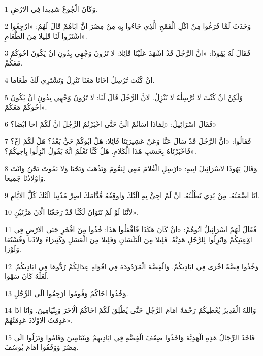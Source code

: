 \par 1 وَكَانَ الْجُوعُ شَدِيدا فِي الارْضِ.
\par 2 وَحَدَثَ لَمَّا فَرَغُوا مِنْ اكْلِ الْقَمْحِ الَّذِي جَاءُوا بِهِ مِنْ مِصْرَ انَّ ابَاهُمْ قَالَ لَهُمُ: «ارْجِعُوا اشْتَرُوا لَنَا قَلِيلا مِنَ الطَّعَامِ».
\par 3 فَقَالَ لَهُ يَهُوذَا: «انَّ الرَّجُلَ قَدْ اشْهَدَ عَلَيْنَا قَائِلا: لا تَرُونَ وَجْهِي بِدُونِ انْ يَكُونَ اخُوكُمْ مَعَكُمْ.
\par 4 انْ كُنْتَ تُرْسِلُ اخَانَا مَعَنَا نَنْزِلُ وَنَشْتَرِي لَكَ طَعَاما.
\par 5 وَلَكِنْ انْ كُنْتَ لا تُرْسِلُهُ لا نَنْزِلُ. لانَّ الرَّجُلَ قَالَ لَنَا: لا تَرُونَ وَجْهِي بِدُونِ انْ يَكُونَ اخُوكُمْ مَعَكُمْ».
\par 6 فَقَالَ اسْرَائِيلُ: «لِمَاذَا اسَاتُمْ الَيَّ حَتَّى اخْبَرْتُمُ الرَّجُلَ انَّ لَكُمْ اخا ايْضا؟»
\par 7 فَقَالُوا: «انَّ الرَّجُلَ قَدْ سَالَ عَنَّا وَعَنْ عَشِيرَتِنَا قَائِلا: هَلْ ابُوكُمْ حَيٌّ بَعْدُ؟ هَلْ لَكُمْ اخٌ؟ فَاخْبَرْنَاهُ بِحَسَبِ هَذَا الْكَلامِ. هَلْ كُنَّا نَعْلَمُ انَّهُ يَقُولُ انْزِلُوا بِاخِيكُمْ؟».
\par 8 وَقَالَ يَهُوذَا لاسْرَائِيلَ ابِيهِ: «ارْسِلِ الْغُلامَ مَعِي لِنَقُومَ وَنَذْهَبَ وَنَحْيَا وَلا نَمُوتَ نَحْنُ وَانْتَ وَاوْلادُنَا جَمِيعا.
\par 9 انَا اضْمَنُهُ. مِنْ يَدِي تَطْلُبُهُ. انْ لَمْ اجِئْ بِهِ الَيْكَ وَاوقِفْهُ قُدَّامَكَ اصِرْ مُذْنِبا الَيْكَ كُلَّ الايَّامِ.
\par 10 لانَّنَا لَوْ لَمْ نَتَوَانَ لَكُنَّا قَدْ رَجَعْنَا الْانَ مَرَّتَيْنِ».
\par 11 فَقَالَ لَهُمْ اسْرَائِيلُ ابُوهُمْ: «انْ كَانَ هَكَذَا فَافْعَلُوا هَذَا: خُذُوا مِنْ افْخَرِ جَنَى الارْضِ فِي اوْعِيَتِكُمْ وَانْزِلُوا لِلرَّجُلِ هَدِيَّةً. قَلِيلا مِنَ الْبَلَسَانِ وَقَلِيلا مِنَ الْعَسَلِ وَكَثِيرَاءَ وَلاذَنا وَفُسْتُقا وَلَوْزا.
\par 12 وَخُذُوا فِضَّةً اخْرَى فِي ايَادِيكُمْ. وَالْفِضَّةَ الْمَرْدُودَةَ فِي افْوَاهِ عِدَالِكُمْ رُدُّوهَا فِي ايَادِيكُمْ. لَعَلَّهُ كَانَ سَهْوا.
\par 13 وَخُذُوا اخَاكُمْ وَقُومُوا ارْجِعُوا الَى الرَّجُلِ.
\par 14 وَاللهُ الْقَدِيرُ يُعْطِيكُمْ رَحْمَةً امَامَ الرَّجُلِ حَتَّى يُطْلِقَ لَكُمْ اخَاكُمُ الْاخَرَ وَبِنْيَامِينَ. وَانَا اذَا عَدِمْتُ الاوْلادَ عَدِمْتُهُمْ».
\par 15 فَاخَذَ الرِّجَالُ هَذِهِ الْهَدِيَّةَ وَاخَذُوا ضِعْفَ الْفِضَّةِ فِي ايَادِيهِمْ وَبِنْيَامِينَ وَقَامُوا وَنَزَلُوا الَى مِصْرَ وَوَقَفُوا امَامَ يُوسُفَ.
